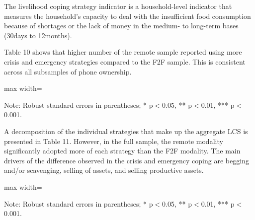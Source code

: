 \documentclass[11pt,harvard]{article}
\begin{document}
The livelihood coping strategy indicator is a household-level indicator that measures the household's capacity to deal with the insufficient food consumption because of shortages or the lack of money in the medium- to long-term bases (30days to 12months).
	
Table 10 shows that higher number of the remote sample reported using more crisis and emergency strategies compared to the F2F sample. This is consistent across all subsamples of phone ownership. 

	\begin{table}[htbp]
		\centering
		\begin{adjustbox}{max width=\textwidth}
			\begin{threeparttable}
				\caption{Impact of Survey Modality on Livelihood Coping Strategy}
				\scriptsize
				 
				\label{tab:LCS_Modality_CAR}
				\begin{tablenotes}
					\item Note: Robust standard errors in parentheses; * p$<$0.05, ** p$<$0.01, *** p$<$0.001. 
				\end{tablenotes}
			\end{threeparttable}
		\end{adjustbox}
	\end{table}

A decomposition of the individual strategies that make up the aggregate LCS is presented in Table 11. However, in the full sample, the remote modality significantly adopted more of each strategy than the F2F modality. The main drivers of the difference observed in the crisis and emergency coping are begging and/or scavenging, selling of assets,  and selling productive assets.

	\begin{table}[htbp]
 		\centering
		\begin{adjustbox}{max width=\textwidth}
			\begin{threeparttable}
				\caption{CAR: Each Coping Strategy Used}
				\scriptsize
				 
				\label{tab:LCS_Ind_Modality_CAR}
				\begin{tablenotes}
					\item Note: Robust standard errors in parentheses; * p$<$0.05, ** p$<$0.01, *** p$<$0.001.
				\end{tablenotes}
			\end{threeparttable}
		\end{adjustbox}
	\end{table}
	
\end{document}

